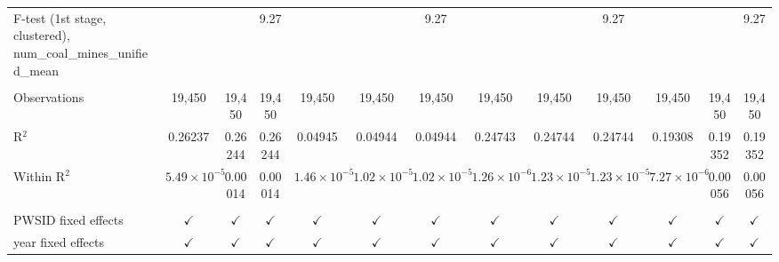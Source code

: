 \begin{table}[htbp]
\begin{adjustbox}{width = \textwidth, center}
\begin{tabular}{lcccccccccccc}
         F-test (1st stage, clustered), num\_coal\_mines\_unified\_mean     &                       &               & 9.27          &                       &                       & 9.27                  &                       &                       & 9.27                  &                       &               & 9.27\\  
         
          \\
         
         Observations                                                       & 19,450                & 19,450        & 19,450        & 19,450                & 19,450                & 19,450                & 19,450                & 19,450                & 19,450                & 19,450                & 19,450        & 19,450\\  
         R$^2$                                                              & 0.26237               & 0.26244       & 0.26244       & 0.04945               & 0.04944               & 0.04944               & 0.24743               & 0.24744               & 0.24744               & 0.19308               & 0.19352       & 0.19352\\  
         Within R$^2$                                                       & $5.49\times 10^{-5}$  & 0.00014       & 0.00014       & $1.46\times 10^{-5}$  & $1.02\times 10^{-5}$  & $1.02\times 10^{-5}$  & $1.26\times 10^{-6}$  & $1.23\times 10^{-5}$  & $1.23\times 10^{-5}$  & $7.27\times 10^{-6}$  & 0.00056       & 0.00056\\  
         
          \\
         
         PWSID fixed effects                                                & $\checkmark$          & $\checkmark$  & $\checkmark$  & $\checkmark$          & $\checkmark$          & $\checkmark$          & $\checkmark$          & $\checkmark$          & $\checkmark$          & $\checkmark$          & $\checkmark$  & $\checkmark$\\   
         year fixed effects                                                 & $\checkmark$          & $\checkmark$  & $\checkmark$  & $\checkmark$          & $\checkmark$          & $\checkmark$          & $\checkmark$          & $\checkmark$          & $\checkmark$          & $\checkmark$          & $\checkmark$  & $\checkmark$\\   
         
         \bottomrule
         

\end{tabular}
\end{adjustbox}
\end{table}
